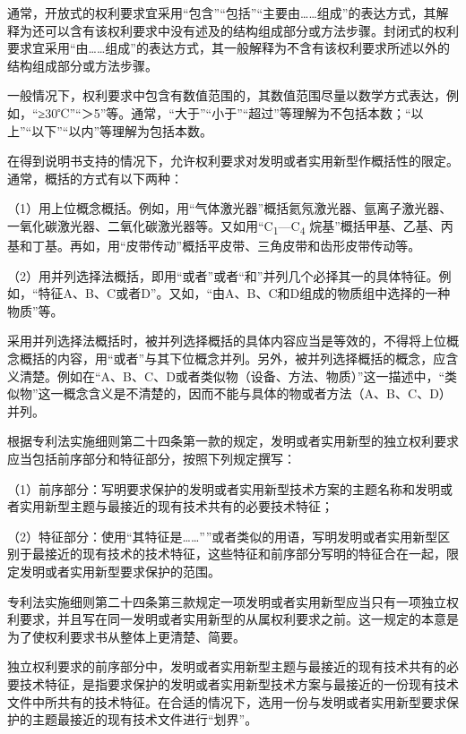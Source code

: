 通常，开放式的权利要求宜采用“包含”“包括”“主要由……组成”的表达方式，其解释为还可以含有该权利要求中没有述及的结构组成部分或方法步骤。封闭式的权利要求宜采用“由……组成”的表达方式，其一般解释为不含有该权利要求所述以外的结构组成部分或方法步骤。

一般情况下，权利要求中包含有数值范围的，其数值范围尽量以数学方式表达，例如，“≥30℃”“＞5”等。通常，“大于”“小于”“超过”等理解为不包括本数；“以上”“以下”“以内”等理解为包括本数。

在得到说明书支持的情况下，允许权利要求对发明或者实用新型作概括性的限定。通常，概括的方式有以下两种：

{\setlength{\parindent}{17.1bp}（1）用上位概念概括。例如，用“气体激光器”概括氦氖激光器、氩离子激光器、一氧化碳激光器、二氧化碳激光器等。又如用“C\textsubscript{1}—C\textsubscript{4} 烷基”概括甲基、乙基、丙基和丁基。再如，用“皮带传动”概括平皮带、三角皮带和齿形皮带传动等。\par}

{\setlength{\parindent}{17.1bp}（2）用并列选择法概括，即用“或者”或者“和”并列几个必择其一的具体特征。例如，“特征A、B、C或者D”。又如，“由A、B、C和D组成的物质组中选择的一种物质”等。\par}

采用并列选择法概括时，被并列选择概括的具体内容应当是等效的，不得将上位概念概括的内容，用“或者”与其下位概念并列。另外，被并列选择概括的概念，应含义清楚。例如在“A、B、C、D或者类似物（设备、方法、物质）”这一描述中，“类似物”这一概念含义是不清楚的，因而不能与具体的物或者方法（A、B、C、D）并列。

根据专利法实施细则第二十四条第一款的规定，发明或者实用新型的独立权利要求应当包括前序部分和特征部分，按照下列规定撰写：

{\setlength{\parindent}{17.1bp}（1）前序部分：写明要求保护的发明或者实用新型技术方案的主题名称和发明或者实用新型主题与最接近的现有技术共有的必要技术特征；\par}

{\setlength{\parindent}{17.1bp}（2）特征部分：使用“其特征是……””或者类似的用语，写明发明或者实用新型区别于最接近的现有技术的技术特征，这些特征和前序部分写明的特征合在一起，限定发明或者实用新型要求保护的范围。\par}

专利法实施细则第二十四条第三款规定一项发明或者实用新型应当只有一项独立权利要求，并且写在同一发明或者实用新型的从属权利要求之前。这一规定的本意是为了使权利要求书从整体上更清楚、简要。

独立权利要求的前序部分中，发明或者实用新型主题与最接近的现有技术共有的必要技术特征，是指要求保护的发明或者实用新型技术方案与最接近的一份现有技术文件中所共有的技术特征。在合适的情况下，选用一份与发明或者实用新型要求保护的主题最接近的现有技术文件进行“划界”。

